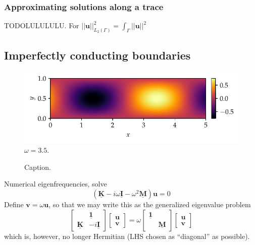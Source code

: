 \documentclass[11pt, a4paper]{article}
\begin{document}
\subsubsection{Approximating solutions along a trace}
\label{subsubsec:traces}
 
TODOLULULULU.
For $||\mathbf{u}||_{L_2(\Gamma)}^2 = \int_{\Gamma} ||\mathbf{u}||^2$

\subsection{Imperfectly conducting boundaries}
\label{subsec:examples-impedance}
\begin{figure}[ht]
    \centering
    \includegraphics{plots/imperfect_conductor_solution.pdf}
    \caption{$\omega = 3.5$.}
    \label{fig:imperfect-conductor-solution}
\end{figure}


\begin{figure}[ht]
    \centering
    
    \caption{Caption.}
    \label{fig:imperfect-conductor-norms}
\end{figure}

Numerical eigenfrequencies, solve
\begin{equation}
    (\mathbf{\underline{K}} - i \omega \mathbf{\underline{I}} - \omega^2 \mathbf{\underline{M}}) \mathbf{u} = 0
\end{equation}
Define $\mathbf{v} = \omega \mathbf{u}$, so that we may write this as the
generalized eigenvalue problem
\begin{equation}
    \begin{bmatrix}
         & \boldsymbol{\underline{1}} \\
        \mathbf{\underline{K}} & -i \mathbf{\underline{I}}
    \end{bmatrix}
    \begin{bmatrix}
        \mathbf{u} \\
        \mathbf{v}
    \end{bmatrix}
    =
    \omega
    \begin{bmatrix}
        \boldsymbol{\underline{1}} & \\
         & \boldsymbol{\underline{M}}
    \end{bmatrix}
    \begin{bmatrix}
        \mathbf{u} \\
        \mathbf{v}
    \end{bmatrix}
\end{equation}
which is, however, no longer Hermitian (LHS chosen as \enquote{diagonal} as possible).
\end{document}
